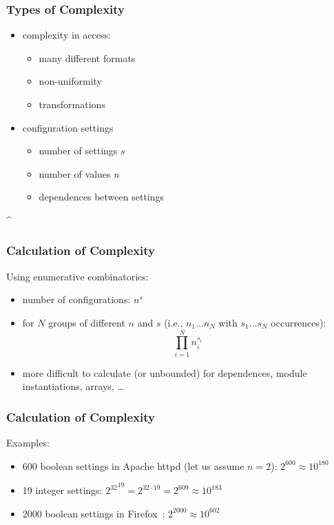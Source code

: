 \begin{frame}
	\frametitle{Types of Complexity}
	\begin{itemize}
	\item complexity in access:
		\begin{itemize}
		\item many different formats
		\item non-uniformity
		\item transformations
		\end{itemize}
	\item configuration settings
		\begin{itemize}
		\item number of settings $s$
		\item number of values $n$
		\item dependences between settings
		\end{itemize}
	\end{itemize}
\end{frame}

\lstDeleteShortInline^
\begin{frame}
	\frametitle{Calculation of Complexity}

	Using enumerative combinatorics:
	\begin{itemize}
	\item number of configurations: $n^s$
	\item for $N$ groups of different $n$ and $s$ (i.e., $n_1 \dots n_N$ with $s_1 \dots s_N$ occurrences):  $$\prod_{i=1}^{N} n_i^{s_i}$$
	\item more difficult to calculate (or unbounded) for dependences, module instantiations, arrays, \dots
	\end{itemize}
\end{frame}

\begin{frame}
	\frametitle{Calculation of Complexity}

	Examples:
	\begin{itemize}
	\item 600 boolean settings in Apache httpd (let us assume $n=2$):
	\pause
	$2^{600} \approx 10^{180}$

	\item 19 integer settings:
	\pause
	${2^{32}}^{19} = 2^{32 \cdot 19} = 2^{609} \approx 10^{183}$

	\item 2000 boolean settings in Firefox~\cite{jin2014configurations}:
	\pause
	$2^{2000} \approx 10^{602}$
	\end{itemize}
\end{frame}

